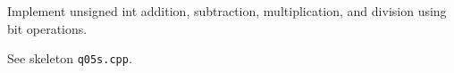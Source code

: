 Implement unsigned int addition, subtraction, multiplication, and division
using bit operations.

See skeleton \verb!q05s.cpp!.
